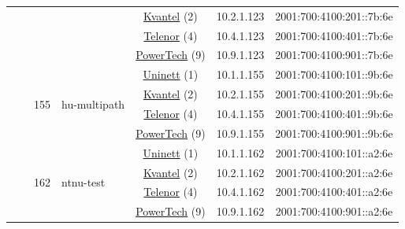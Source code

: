 \begin{small}
\begin{center}
\begin{longtable}{|c|c|c|c|c|c|c|c|}
  &  &  &  & \multicolumn{2}{|c|}{\tiny{\href{http://kvantel.no}{Kvantel} (2)}} & \tiny{10.2.1.123} & \tiny{2001:700:4100:201::7b:6e} \\* \cline{5-5}\cline{6-6}\cline{7-7}\cline{8-8}
  &  &  &  & \multicolumn{2}{|c|}{\tiny{\href{https://www.telenor.no}{Telenor} (4)}} & \tiny{10.4.1.123} & \tiny{2001:700:4100:401::7b:6e} \\* \cline{5-5}\cline{6-6}\cline{7-7}\cline{8-8}
  &  &  &  & \multicolumn{2}{|c|}{\tiny{\href{http://www.powertech.no}{PowerTech} (9)}} & \tiny{10.9.1.123} & \tiny{2001:700:4100:901::7b:6e} \\* \cline{3-3}\cline{4-4}\cline{5-5}\cline{6-6}\cline{7-7}\cline{8-8}
  &  & \multirow{4}{*}{\tiny{155}} & \multicolumn{1}{|l|}{\multirow{4}{*}{\tiny{hu-multipath}}} & \multicolumn{2}{|c|}{\tiny{\href{https://www.uninett.no}{Uninett} (1)}} & \tiny{10.1.1.155} & \tiny{2001:700:4100:101::9b:6e} \\* \cline{5-5}\cline{6-6}\cline{7-7}\cline{8-8}
  &  &  &  & \multicolumn{2}{|c|}{\tiny{\href{http://kvantel.no}{Kvantel} (2)}} & \tiny{10.2.1.155} & \tiny{2001:700:4100:201::9b:6e} \\* \cline{5-5}\cline{6-6}\cline{7-7}\cline{8-8}
  &  &  &  & \multicolumn{2}{|c|}{\tiny{\href{https://www.telenor.no}{Telenor} (4)}} & \tiny{10.4.1.155} & \tiny{2001:700:4100:401::9b:6e} \\* \cline{5-5}\cline{6-6}\cline{7-7}\cline{8-8}
  &  &  &  & \multicolumn{2}{|c|}{\tiny{\href{http://www.powertech.no}{PowerTech} (9)}} & \tiny{10.9.1.155} & \tiny{2001:700:4100:901::9b:6e} \\* \cline{3-3}\cline{4-4}\cline{5-5}\cline{6-6}\cline{7-7}\cline{8-8}
  &  & \multirow{4}{*}{\tiny{162}} & \multicolumn{1}{|l|}{\multirow{4}{*}{\tiny{ntnu-test}}} & \multicolumn{2}{|c|}{\tiny{\href{https://www.uninett.no}{Uninett} (1)}} & \tiny{10.1.1.162} & \tiny{2001:700:4100:101::a2:6e} \\* \cline{5-5}\cline{6-6}\cline{7-7}\cline{8-8}
  &  &  &  & \multicolumn{2}{|c|}{\tiny{\href{http://kvantel.no}{Kvantel} (2)}} & \tiny{10.2.1.162} & \tiny{2001:700:4100:201::a2:6e} \\* \cline{5-5}\cline{6-6}\cline{7-7}\cline{8-8}
  &  &  &  & \multicolumn{2}{|c|}{\tiny{\href{https://www.telenor.no}{Telenor} (4)}} & \tiny{10.4.1.162} & \tiny{2001:700:4100:401::a2:6e} \\* \cline{5-5}\cline{6-6}\cline{7-7}\cline{8-8}
  &  &  &  & \multicolumn{2}{|c|}{\tiny{\href{http://www.powertech.no}{PowerTech} (9)}} & \tiny{10.9.1.162} & \tiny{2001:700:4100:901::a2:6e} \\* \cline{3-3}\cline{4-4}\cline{5-5}\cline{6-6}\cline{7-7}\cline{8-8}

\end{longtable}
\end{center}
\end{small}
